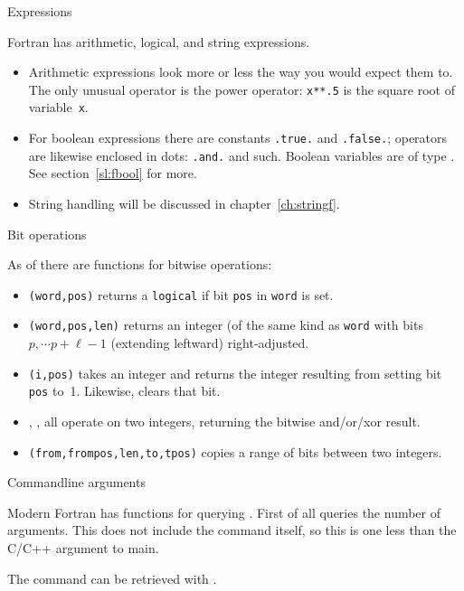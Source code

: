  {Expressions}

Fortran has arithmetic, logical, and string expressions.
\begin{itemize}
\item Arithmetic expressions look more or less the way you would expect them to.
  The only unusual operator is the power operator: \lstinline+x**.5+ is the
  square root of variable~\lstinline{x}.
\item For boolean expressions there are constants \lstinline+.true.+ and \lstinline+.false.+;
  operators are likewise enclosed in dots: \lstinline+.and.+ and such.
  Boolean variables are of type .
  See section~\ref{sl:fbool} for more.
\item String handling will be discussed in chapter~\ref{ch:stringf}.
\end{itemize}

 {Bit operations}
\label{sec:bitf}

As of  there are functions for bitwise operations:
\begin{itemize}
\item {}\lstinline+(word,pos)+
  returns a \lstinline{logical}
  if bit \lstinline{pos} in \lstinline{word} is set.
\item {}\lstinline+(word,pos,len)+
  returns an integer (of the same kind as \lstinline{word}
  with bits $p,\cdots p+\ell-1$ (extending leftward)
  right-adjusted.
\item {}\lstinline+(i,pos)+
  takes an integer and
  returns the integer resulting from setting bit \lstinline{pos} to~1.
  Likewise,  clears that bit.
\item {}, , 
  all operate on two integers, returning the bitwise and/or/xor result.
\item {}\lstinline+(from,frompos,len,to,tpos)+
  copies a range of bits between two integers.
\end{itemize}

 {Commandline arguments}

Modern Fortran has functions for querying
.
First of all  queries the number
of arguments.
This does not include the command itself,
so this is one less than the C/C++  argument to main.

The command can be retrieved with .

